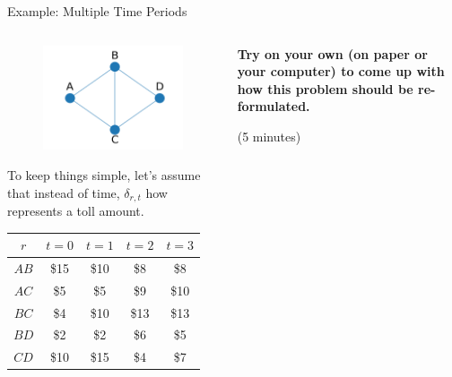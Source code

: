\documentclass[10pt, aspectratio=169]{beamer}
\begin{document}
\begin{frame}{Example: Multiple Time Periods}
    \begin{columns}
        \begin{column}{0.5\textwidth}
            \begin{center}
                \begin{figure}
                    \includegraphics[width=0.6\linewidth]{RoutePlanningProblemBlank.png}
                \end{figure}
                \vspace{-0.2cm}
                To keep things simple, let's assume that instead of time, $\delta_{r,t}$ how represents a toll amount.

                \vspace{0.2cm}

                \begin{tabular}{|c||c|c|c|c|}
                    \hline
                    $r$ & $t=0$ & $t=1$ & $t=2$ & $t=3$ \\
                    \hline \hline
                    $AB$ & \$15 & \$10 & \$8 & \$8\\
                    \hline
                    $AC$ & \$5 & \$5 & \$9 & \$10\\
                    \hline
                    $BC$ & \$4 & \$10 & \$13 & \$13\\
                    \hline
                    $BD$ & \$2 & \$2 & \$6 & \$5\\
                    \hline
                    $CD$ & \$10 & \$15 & \$4 & \$7\\
                    \hline
                \end{tabular}
            \end{center}
        \end{column}
        \begin{column}{0.5\textwidth}
            \begin{center}
                \textbf{Try on your own (on paper or your computer) to come up with how this problem should be re-formulated.}

                \vspace{0.2cm}

                (5 minutes)
            \end{center}
        \end{column}
    \end{columns}
\end{frame}
\end{document}
